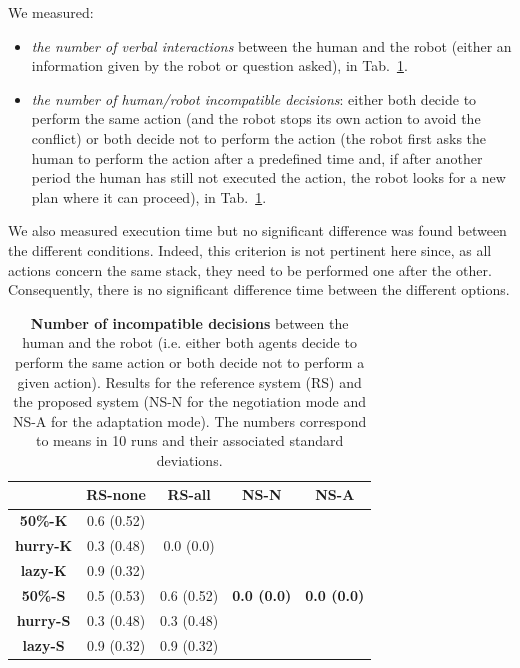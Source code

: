 \documentclass[english,a4paper,11pt,twoside]{StyleThese}
\begin{document}
We measured:
\begin{itemize}
\item \textit{the number of verbal interactions} between the human and the robot (either an information given by the robot or question asked), in Tab.~\ref{tab:incompatible}.
\item \textit{the number of human/robot incompatible decisions}: either both decide to perform the same action (and the robot stops its own action to avoid the conflict) or both decide not to perform the action (the robot first asks the human to perform the action after a predefined time and, if after another period the human has still not executed the action, the robot looks for a new plan where it can proceed), in Tab.~\ref{tab:incompatible}.
\end{itemize}
We also measured execution time but no significant difference was found between the different conditions. Indeed, this criterion is not pertinent here since, as all actions concern the same stack, they need to be performed one after the other. Consequently, there is no significant difference time between the different options.

\begin{table}[!h]
\centering
  \begin{tabular}{|c||c|c|c|c|}
  \hline
     & \textbf{RS-none} & \textbf{RS-all} & \textbf{NS-N} & \textbf{NS-A} \\
  \hline
  \hline
     \textbf{50\%-K} & 0.6 (0.52) & & &  \\
  \cline{1-2}
     \textbf{hurry-K} & 0.3 (0.48) & 0.0 (0.0) & & \\
  \cline{1-2}
     \textbf{lazy-K} & 0.9 (0.32) &  &  &  \\
  \cline{1-3}
     \textbf{50\%-S} & 0.5 (0.53) & 0.6 (0.52) & \textbf{0.0 (0.0)} & \textbf{0.0 (0.0)} \\
  \cline{1-3}
     \textbf{hurry-S} & 0.3 (0.48) & 0.3 (0.48) &  &  \\
  \cline{1-3}
     \textbf{lazy-S} & 0.9 (0.32) & 0.9 (0.32) &  &  \\
  \hline
  \end{tabular}
   \caption{\textbf{Number of incompatible decisions} between the human and the robot (i.e. either both agents decide to perform the same action or both decide not to perform a given action). Results for the reference system (RS) and the proposed system (NS-N for the negotiation mode and NS-A for the adaptation mode). The numbers correspond to means in 10 runs and their associated standard deviations.}
   \label{tab:incompatible} 
\end{table}
\end{document}
